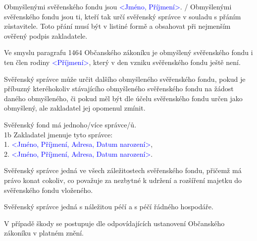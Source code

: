 \documentclass[parskip=half]{scrreprt}
\begin{document}
\begin{contract}


Obmyšlenými svěřenského fondu jsou \textcolor{blue}{<Jméno, Příjmení>}. / Obmyšlenými svěřenského fondu jsou ti, kteří tak určí svěřenský správce v souladu s přáním zůstavitele. Toto přání musí být v listiné formě a obsahovat při nejmenším ověřený podpis zakladatele.

Ve smyslu paragrafu 1464 Občanského zákoníku je obmyšlený svěřenského fondu i ten člen rodiny \textcolor{blue}{<Příjmení>}, který v den vzniku svěřenského fondu ještě není.


Svěřenský správce může určit dalšího obmyšleného svěřenského fondu, pokud je příbuzný kteréhokoliv stávajícího obmyšleného svěřenského fondu na žádost daného obmyšleného, či pokud měl být dle účelu svěřenského fondu určen jako obmyšlený, ale zakladatel jej opomenul zmínit.



Svěřenský fond má jednoho/více správce/ů.\\
1b Zakladatel jmenuje tyto správce:\\
1. \textcolor{blue}{<Jméno, Příjmení, Adresa, Datum narození>},\\
2. \textcolor{blue}{<Jméno, Příjmení, Adresa, Datum narození>}.

Svěřenský správce jedná ve všech záležitostech svěřenského fondu, přičemž má právo konat cokoliv, co považuje za nezbytné k udržení a rozšíření majetku do svěřenského fondu vloženého.

Svěřenský správce jedná s náležitou péčí a s péčí řádného hospodáře.

V případě škody se postupuje dle odpovídajících ustanovení Občanského zákoníku v platném znění.


\end{contract}
\end{document}
